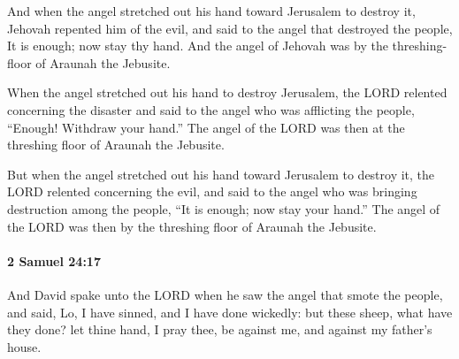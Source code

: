 			\begin{versebox}
					\item[BHS] 
					\item[ASV] And when the angel stretched out his hand toward Jerusalem to destroy it, Jehovah repented him of the evil, and said to the angel that destroyed the people, It is enough; now stay thy hand. And the angel of Jehovah was by the threshing-floor of Araunah the Jebusite.
					\item[NIV] When the angel stretched out his hand to destroy Jerusalem, the LORD relented concerning the disaster and said to the angel who was afflicting the people, “Enough! Withdraw your hand.” The angel of the LORD was then at the threshing floor of Araunah the Jebusite.
					\item[NRSV] But when the angel stretched out his hand toward Jerusalem to destroy it, the LORD relented concerning the evil, and said to the angel who was bringing destruction among the people, “It is enough; now stay your hand.” The angel of the LORD was then by the threshing floor of Araunah the Jebusite.
			\end{versebox}

		\paragraph{2 Samuel 24:17} %
			\label{2SAMUEL-24-17}

			And David spake unto the LORD when he saw the angel that smote the people, and said, Lo, I have sinned, and I have done wickedly: but these sheep, what have they done? let thine hand, I pray thee, be against me, and against my father’s house.

